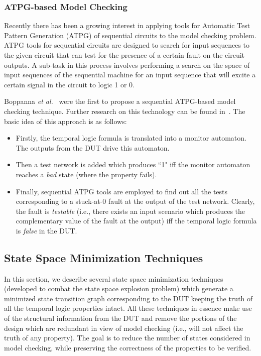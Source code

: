 \subsubsection{ATPG-based Model Checking}
Recently there has been a growing interest in applying tools
for Automatic Test Pattern Generation (ATPG) of sequential
circuits to the model checking problem. ATPG tools for sequential
circuits are designed to search for input sequences to the given circuit that 
can test for the presence of a certain fault on the circuit outputs.
A sub-task in this process involves performing a search on
the space of input sequences of the sequential machine for an
input sequence that will excite a certain signal in the circuit
to logic 1 or 0. 

\noindent
Boppanna {\em et al.}~\cite{boppana:99} were the first to propose a sequential 
ATPG-based model checking technique. Further research on this technology can 
be found in~\cite{abraham:02,sheng:02}. The basic idea of this 
approach is as follows:
\begin{itemize}
\item 	Firstly, the temporal logic formula is translated into a monitor 
		automaton. The outputs from the DUT drive this automaton.
\item	Then a test network is added which produces ``1" iff the monitor 
		automaton reaches a {\em bad} state (where the property fails).
\item	Finally, sequential ATPG tools are employed to find out all the tests
		corresponding to a stuck-at-0 fault at the output of the test network.
		Clearly, the fault is {\em testable} (i.e., there exists an input 
		scenario which produces the complementary value of the fault at the 
		output) iff the temporal logic formula is {\em false} in the DUT.  
\end{itemize}

\subsection{State Space Minimization Techniques}
In this section, we describe several state space minimization techniques 
(developed to combat the state space explosion problem) which 
generate a minimized 
state transition graph corresponding to the DUT keeping the truth of all the 
temporal logic properties intact. All these techniques in essence make 
use of the structural information from the DUT and remove the portions of 
the design which are redundant in view of model checking (i.e., will not 
affect the truth of any property). The goal is to reduce the number of 
states considered in model checking, while preserving the correctness of 
the properties to be verified. 

